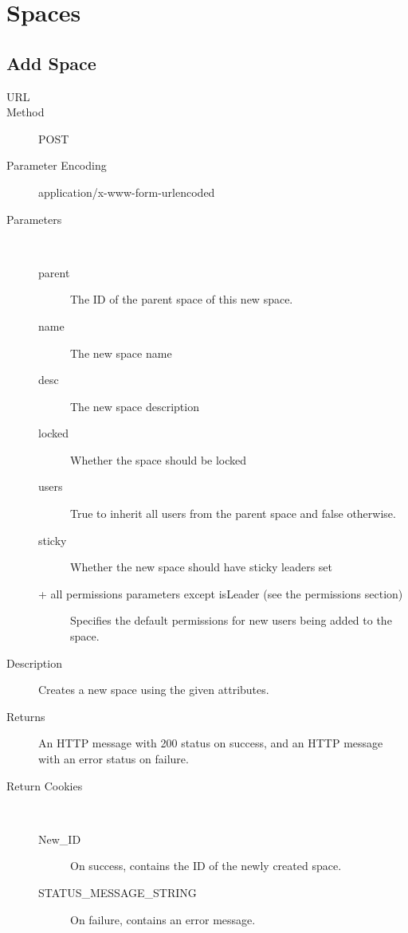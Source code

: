\chapter{Spaces}

\section{Add Space}
\begin{description}
\item [URL] 
\item [Method] POST
\item [Parameter Encoding] application/x-www-form-urlencoded
\item [Parameters] \
	\begin{description}
	\item [parent]  The ID of the parent space of this new space.
	\item [name]  The new space name
	\item [desc] \type{String} The new space description
	\item [locked]  Whether the space should be locked
	\item [users]  True to inherit all users from the parent space and false otherwise.
	\item [sticky] \type{Boolean} Whether the new space should have sticky leaders set
	\item [+ all permissions parameters except isLeader (see the permissions section)] Specifies the default permissions for new users being added to the space.
	\end{description}
\item [Description] Creates a new space using the given attributes.
\item [Returns] An HTTP message with 200 status on success, and an HTTP message with an error status on failure.
\item [Return Cookies] \
	\begin{description}
	\item [New\_ID]  On success, contains the ID of the newly created space.
	\item [STATUS\_MESSAGE\_STRING]  On failure, contains an error message.
	\end{description}
\end{description}

